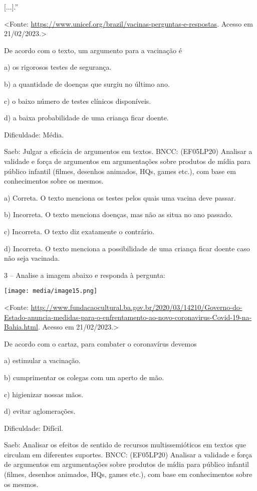 {[}...{]}.''

\textless{}Fonte:
\url{https://www.unicef.org/brazil/vacinas-perguntas-e-respostas}.
Acesso em 21/02/2023.\textgreater{}

De acordo com o texto, um argumento para a vacinação é

a) os rigorosos testes de segurança.

b) a quantidade de doenças que surgiu no último ano.

c) o baixo número de testes clínicos disponíveis.

d) a baixa probabilidade de uma criança ficar doente.

Dificuldade: Média.

Saeb: Julgar a eficácia de argumentos em textos. BNCC: (EF05LP20)
Analisar a validade e força de argumentos em argumentações sobre
produtos de mídia para público infantil (filmes, desenhos animados, HQs,
games etc.), com base em conhecimentos sobre os mesmos.

a) Correta. O texto menciona os testes pelos quais uma vacina deve
passar.

b) Incorreta. O texto menciona doenças, mas não as situa no ano passado.

c) Incorreta. O texto diz exatamente o contrário.

d) Incorreta. O texto menciona a possibilidade de uma criança ficar
doente caso não seja vacinada.

3 -- Analise a imagem abaixo e responda à pergunta:

\texttt{[image: media/image15.png]}

\textless{}Fonte:
\url{http://www.fundacaocultural.ba.gov.br/2020/03/14210/Governo-do-Estado-anuncia-medidas-para-o-enfrentamento-ao-novo-coronavirus-Covid-19-na-Bahia.html}.
Acesso em 21/02/2023.\textgreater{}

De acordo com o cartaz, para combater o coronavírus devemos

a) estimular a vacinação.

b) cumprimentar os colegas com um aperto de mão.

c) higienizar nossas mãos.

d) evitar aglomerações.

Dificuldade: Difícil.

Saeb: Analisar os efeitos de sentido de recursos multissemióticos em
textos que circulam em diferentes suportes. BNCC: (EF05LP20) Analisar a
validade e força de argumentos em argumentações sobre produtos de mídia
para público infantil (filmes, desenhos animados, HQs, games etc.), com
base em conhecimentos sobre os mesmos.

